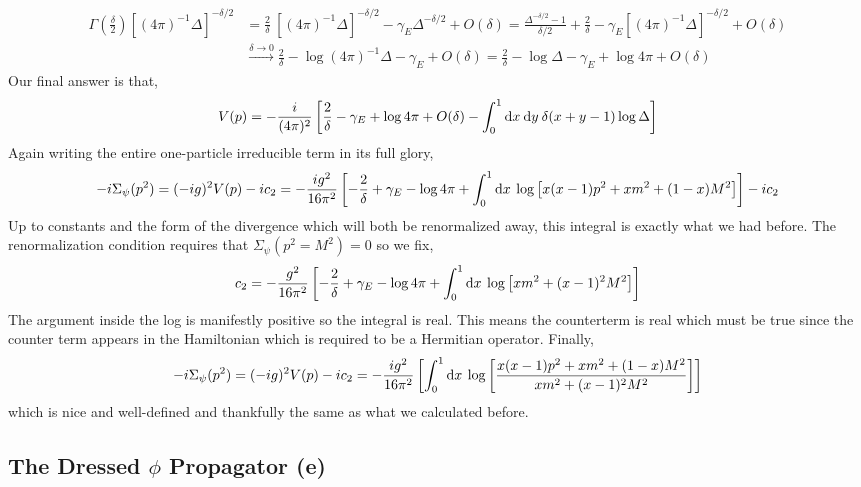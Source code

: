 \documentclass[12pt]{extarticle}
\begin{document}
\begin{align*} 
\Gamma\left(\tfrac{\delta}{2}\right) \left[(4 \pi)^{-1} \Delta \right]^{- \delta / 2}
& = \frac{2}{\delta} \: \left[(4 \pi)^{-1} \Delta \right]^{- \delta / 2} - \gamma_E \Delta^{- \delta / 2} + O(\delta) = \frac{\Delta^{-\delta/2} - 1}{\delta/2} + \frac{2}{\delta} - \gamma_E \left[(4 \pi)^{-1} \Delta \right]^{- \delta / 2} + O(\delta)
\\
&  \xrightarrow{\delta \to 0} \frac{2}{\delta} - \log{(4 \pi)^{-1} \Delta} - \gamma_E  + O(\delta) = \frac{2}{\delta} - \log{\Delta} - \gamma_E + \log{4 \pi} + O(\delta)
\end{align*}
Our final answer is that,
\begin{align*}
 V(p) = -\frac{i}{(4 \pi)^2} \left[ \frac{2}{\delta} - \gamma_E + \log{4 \pi} + O(\delta) -  \int_{0}^{1} \mathrm{d}x \: \mathrm{d}y \: \delta(x + y - 1) \log{\Delta} \right]
\end{align*}
Again writing the entire one-particle irreducible term in its full glory,
\[ - i \Sigma_\psi(p^2) = (-ig)^2 V(p) - i c_2 = -\frac{ig^2}{16 \pi^2} \left[ - \frac{2}{\delta} + \gamma_E - \log{4 \pi} + \int_{0}^{1} \mathrm{d}x \: \log{\left[ x(x - 1) p^2 + x m^2 + (1 - x) M^2 \right]} \right] - i c_2 \]
Up to constants and the form of the divergence which will both be renormalized away, this integral is exactly what we had before. 
The renormalization condition requires that $\Sigma_\psi(p^2 = M^2) = 0$ so we fix,
\[ c_2 = -\frac{g^2}{16 \pi^2} \left[ - \frac{2}{\delta} + \gamma_E - \log{4 \pi} + \int_{0}^{1} \mathrm{d}x \:   \log{\left[ x m^2 + (x - 1)^2 M^2 \right]} \right] \]
The argument inside the log is manifestly positive so the integral is real. This means the counterterm is real which must be true since the counter term appears in the Hamiltonian which is required to be a Hermitian operator. Finally,
\[ - i \Sigma_\psi(p^2) = (-ig)^2 V(p) - i c_2 = - \frac{ig^2}{16 \pi^2} \left[ \int_{0}^{1} \mathrm{d}x \: \log{\left[\frac{ x(x - 1) p^2 + x m^2 + (1 - x) M^2}{x m^2 + (x - 1)^2 M^2} \right]} \right] \]
which is nice and well-defined and thankfully the same as what we calculated before.

\subsection{The Dressed $\phi$ Propagator (e)}
\end{document}
